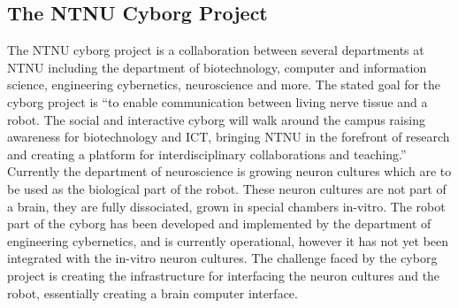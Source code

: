 \subsection{The NTNU Cyborg Project}
The NTNU cyborg project is a collaboration between several departments at NTNU
including the department of biotechnology, computer and information science,
engineering cybernetics, neuroscience and more. \cite{ntnu_cyborg}
The stated goal for the cyborg project is ``to enable communication between living
nerve tissue and a robot. The social and interactive cyborg will walk around the campus
raising awareness for biotechnology and ICT, bringing NTNU in the forefront of research
and creating a platform for interdisciplinary collaborations and teaching.''
Currently the department of neuroscience is growing neuron cultures which are to
be used as the biological part of the robot.
These neuron cultures are not part of a brain, they are fully dissociated, grown
in special chambers in-vitro.
The robot part of the cyborg has been developed and implemented by the
department of engineering cybernetics, and is currently operational, however it
has not yet been integrated with the in-vitro neuron cultures.
The challenge faced by the cyborg project is creating the infrastructure for
interfacing the neuron cultures and the robot, essentially creating a brain
computer interface.
